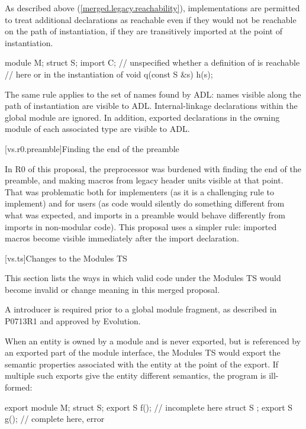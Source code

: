 \pnum
As described above (\ref{merged.legacy.reachability}),
implementations are permitted to treat additional declarations
as reachable even if they would not be reachable on the
path of instantiation,
if they are transitively imported at the
point of instantiation.
\begin{example}
\begin{codeblock}
module M;
struct S;
import C;
// unspecified whether a definition of  is reachable
// here or in the instantiation of 
void q(const S &s) { h(s); }
\end{codeblock}
\end{example}

\pnum
The same rule applies to the set of names found by ADL:
names visible along the path of instantiation are visible to ADL.
Internal-linkage declarations within the global module are ignored.
In addition, exported declarations in the owning module of
each associated type are visible to ADL.

[vs.r0.preamble]{Finding the end of the preamble}

\pnum
In R0 of this proposal, the preprocessor was burdened with finding
the end of the preamble, and making macros from legacy header units
visible at that point.
That was problematic both for implementers (as it is a challenging rule
to implement) and for users (as code would silently do something
different from what was expected, and imports in a preamble would
behave differently from imports in non-modular code).
This proposal uses a simpler rule:
imported macros become visible immediately after the import declaration.

[vs.ts]{Changes to the Modules TS}

\pnum
This section lists the ways in which valid code under the Modules TS
would become invalid or change meaning in this merged proposal.

\pnum
A  introducer is required prior to a global module fragment,
as described in P0713R1 and approved by Evolution.

\pnum
When an entity is owned by a module and is never exported,
but is referenced by an exported part of the module interface,
the Modules TS would export the semantic properties
associated with the entity at the point of the export.
If multiple such exports give the entity different semantics,
the program is ill-formed:

\begin{codeblock}
export module M;
struct S;
export S f();  //  incomplete here
struct S {};
export S g();  //  complete here, error
\end{codeblock}

